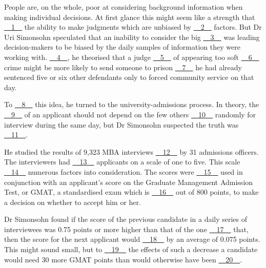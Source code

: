 People are, on the whole, poor at considering background information when making individual decisions. At first glance this might seem like a strength that \uline{~~1~~} the ability to make judgments which are unbiased by \uline{~~2~~} factors. But Dr Uri Simonsohn speculated that an inability to consider the big \uline{~~3~~} was leading decision-makers to be biased by the daily samples of information they were working with. \uline{~~4~~}, he theorised that a judge \uline{~~5~~} of appearing too soft \uline{~~6~~} crime might be more likely to send someone to prison \uline{~~7~~} he had already sentenced five or six other defendants only to forced community service on that day.


To \uline{~~8~~} this idea, he turned to the university-admissions process. In theory, the \uline{~~9~~} of an applicant should not depend on the few others \uline{~~10~~} randomly for interview during the same day, but Dr Simonsohn suspected the truth was \uline{~~11~~}.


He studied the results of 9,323 MBA interviews \uline{~~12~~} by 31 admissions officers. The interviewers had \uline{~~13~~} applicants on a scale of one to five. This scale \uline{~~14~~} numerous factors into consideration. The scores were \uline{~~15~~} used in conjunction with an applicant's score on the Graduate Management Admission Test, or GMAT, a standardised exam which is \uline{~~16~~} out of 800 points, to make a  decision on whether to accept him or her.


Dr Simonsohn found if the score of the previous candidate in a daily series of interviewees was 0.75 points or more higher than that of the one \uline{~~17~~} that, then  the score for the next applicant would \uline{~~18~~} by an average of 0.075 points. This  might sound small, but to \uline{~~19~~} the effects of such a decrease a candidate would  need 30 more GMAT points than would otherwise have been \uline{~~20~~}.